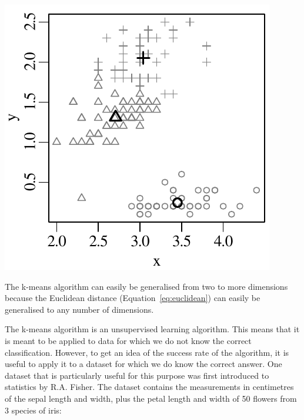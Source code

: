 \begin{enumerate}
  \noindent\begin{minipage}[t][][b]{.25\linewidth}
  \includegraphics[width=\textwidth]{../figures/kmeans5.pdf}\medskip
  \end{minipage}
  \begin{minipage}[t][][t]{.75\linewidth}
    \label{fig:kmeans5}
  \end{minipage}

\end{enumerate}

The k-means algorithm can easily be generalised from two to more
dimensions because the Euclidean distance
(Equation~\ref{eq:euclidean}) can easily be generalised to any number
of dimensions.\medskip

The k-means algorithm is an unsupervised learning algorithm. This
means that it is meant to be applied to data for which we do not know
the correct classification. However, to get an idea of the success
rate of the algorithm, it is useful to apply it to a dataset for which
we do know the correct answer.  One dataset that is particularly
useful for this purpose was first introduced to statistics by
R.A. Fisher. The dataset contains the measurements in centimetres of
the sepal length and width, plus the petal length and width of 50
flowers from 3 species of iris:

